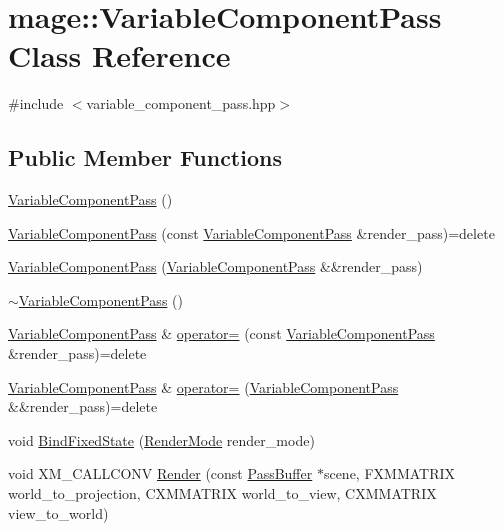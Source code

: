 \hypertarget{classmage_1_1_variable_component_pass}{}\section{mage\+:\+:Variable\+Component\+Pass Class Reference}
\label{classmage_1_1_variable_component_pass}


{\ttfamily \#include $<$variable\+\_\+component\+\_\+pass.\+hpp$>$}

\subsection*{Public Member Functions}
\begin{DoxyCompactItemize}
\item 
\hyperlink{classmage_1_1_variable_component_pass_a86224a1702761665451b3c6e78557261}{Variable\+Component\+Pass} ()
\item 
\hyperlink{classmage_1_1_variable_component_pass_a535ac4989db673e69870090494f454dd}{Variable\+Component\+Pass} (const \hyperlink{classmage_1_1_variable_component_pass}{Variable\+Component\+Pass} \&render\+\_\+pass)=delete
\item 
\hyperlink{classmage_1_1_variable_component_pass_a2721ef623ca91abfac8ae7092094a0fb}{Variable\+Component\+Pass} (\hyperlink{classmage_1_1_variable_component_pass}{Variable\+Component\+Pass} \&\&render\+\_\+pass)
\item 
\hyperlink{classmage_1_1_variable_component_pass_addf03c307a88e6a1871f0ec3adbb8bcb}{$\sim$\+Variable\+Component\+Pass} ()
\item 
\hyperlink{classmage_1_1_variable_component_pass}{Variable\+Component\+Pass} \& \hyperlink{classmage_1_1_variable_component_pass_a9df39d8323fea2b411a4f84abe8bac3c}{operator=} (const \hyperlink{classmage_1_1_variable_component_pass}{Variable\+Component\+Pass} \&render\+\_\+pass)=delete
\item 
\hyperlink{classmage_1_1_variable_component_pass}{Variable\+Component\+Pass} \& \hyperlink{classmage_1_1_variable_component_pass_ab4c2ccc632031ec51c16f7c9d500e427}{operator=} (\hyperlink{classmage_1_1_variable_component_pass}{Variable\+Component\+Pass} \&\&render\+\_\+pass)=delete
\item 
void \hyperlink{classmage_1_1_variable_component_pass_af020fa18b0df2abe39d953d9e78db37d}{Bind\+Fixed\+State} (\hyperlink{namespacemage_a5e7e18b0154373ce8fc942fe3f6b27fd}{Render\+Mode} render\+\_\+mode)
\item 
void X\+M\+\_\+\+C\+A\+L\+L\+C\+O\+NV \hyperlink{classmage_1_1_variable_component_pass_aacabfd4a5cd30950a161457c7fb9e098}{Render} (const \hyperlink{structmage_1_1_pass_buffer}{Pass\+Buffer} $\ast$scene, F\+X\+M\+M\+A\+T\+R\+IX world\+\_\+to\+\_\+projection, C\+X\+M\+M\+A\+T\+R\+IX world\+\_\+to\+\_\+view, C\+X\+M\+M\+A\+T\+R\+IX view\+\_\+to\+\_\+world)
\end{DoxyCompactItemize}
